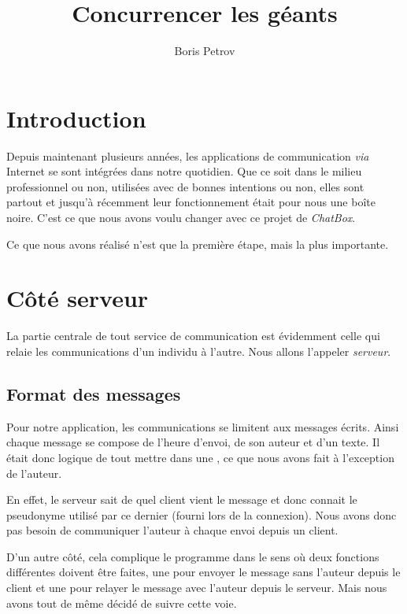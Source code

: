 \documentclass[11pt,a4paper]{article}
\title{Concurrencer les géants}
\author{Boris Petrov}
\date{}
\begin{document}
\maketitle
\tableofcontents


\section{Introduction}

Depuis maintenant plusieurs années, les applications de
communication \emph{via} Internet se sont intégrées dans notre
quotidien. Que ce soit dans le milieu professionnel ou non,
utilisées avec de bonnes intentions ou non, elles sont
partout et jusqu'à récemment leur fonctionnement était pour
nous une boîte noire. C'est ce que nous avons voulu changer
avec ce projet de \emph{ChatBox}.

Ce que nous avons réalisé n'est que la première
étape, mais la plus importante.

\section{Côté serveur}

La partie centrale de tout service de communication est
évidemment celle qui relaie les communications d'un individu
à l'autre. Nous allons l'appeler \emph{serveur}.

\subsection{Format des messages}

Pour notre application, les communications se limitent aux
messages écrits. Ainsi chaque message se compose de l'heure
d'envoi, de son auteur et d'un texte.
Il était donc logique de tout mettre dans une
\verb@struct@, ce que nous avons fait à l'exception
de l'auteur.

En effet, le serveur sait de quel client vient le message et
donc connait le pseudonyme utilisé par ce dernier (fourni
lors de la connexion). Nous avons donc pas besoin de
communiquer l'auteur à chaque envoi depuis un client.

D'un autre côté, cela complique le programme dans le sens où
deux fonctions différentes doivent être faites, une pour
envoyer le message sans l'auteur depuis le client et une
pour relayer le message avec l'auteur depuis le serveur.
Mais nous avons tout de même décidé de suivre cette voie.
\end{document}

